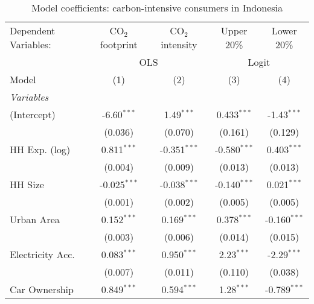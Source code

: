 
\begin{table}[htbp!]
   \centering
   \small
   \begin{adjustbox}{width = 1\textwidth, max height = 0.95\textheight, center}
      \begin{threeparttable}[b]
         \caption{\label{tab:Logit_1_IDN} Model coefficients: carbon-intensive consumers in Indonesia}
         \begin{tabular}{lcccc}
            \tabularnewline \midrule \midrule
            Dependent Variables: & CO$_{2}$ footprint & CO$_{2}$ intensity & Upper 20\%     & Lower 20\%\\   
             & \multicolumn{2}{c}{OLS} & \multicolumn{2}{c}{Logit} \\ 
            Model                & (1)                & (2)                & (3)            & (4)\\  
            \midrule
            \emph{Variables}\\
            (Intercept)          & -6.60$^{***}$      & 1.49$^{***}$       & 0.433$^{***}$  & -1.43$^{***}$\\   
                                 & (0.036)            & (0.070)            & (0.161)        & (0.129)\\   
            HH Exp. (log)        & 0.811$^{***}$      & -0.351$^{***}$     & -0.580$^{***}$ & 0.403$^{***}$\\   
                                 & (0.004)            & (0.009)            & (0.013)        & (0.013)\\   
            HH Size              & -0.025$^{***}$     & -0.038$^{***}$     & -0.140$^{***}$ & 0.021$^{***}$\\   
                                 & (0.001)            & (0.002)            & (0.005)        & (0.005)\\   
            Urban Area           & 0.152$^{***}$      & 0.169$^{***}$      & 0.378$^{***}$  & -0.160$^{***}$\\   
                                 & (0.003)            & (0.006)            & (0.014)        & (0.015)\\   
            Electricity Acc.     & 0.083$^{***}$      & 0.950$^{***}$      & 2.23$^{***}$   & -2.29$^{***}$\\   
                                 & (0.007)            & (0.011)            & (0.110)        & (0.038)\\   
            Car Ownership        & 0.849$^{***}$      & 0.594$^{***}$      & 1.28$^{***}$   & -0.789$^{***}$\\   

\end{tabular}
\end{threeparttable}
\end{adjustbox}
\end{table}
